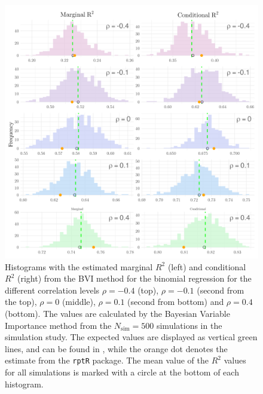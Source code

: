 \begin{figure}[H]
  \centering
  \includegraphics[width=1.1\linewidth]{Figures/Simulation study/R2_combined_poisson.png}
  \caption{Histograms with the estimated marginal $R^2$ (left) and conditional $R^2$ (right) from the BVI method for the binomial regression for the different correlation levels $\rho=-0.4$ (top), $\rho=-0.1$ (second from the top), $\rho=0$ (middle), $\rho=0.1$ (second from bottom) and $\rho=0.4$ (bottom). The values are calculated by the Bayesian Variable Importance method from the $N_{\text{sim}}=500$ simulations in the simulation study. The expected values are displayed as vertical green lines, and can be found in , while the orange dot denotes the estimate from the \texttt{rptR} package. The mean value of the $R^2$ values for all simulations is marked with a circle at the bottom of each histogram.}
  \label{fig:r2_combined_poisson}
\end{figure}




